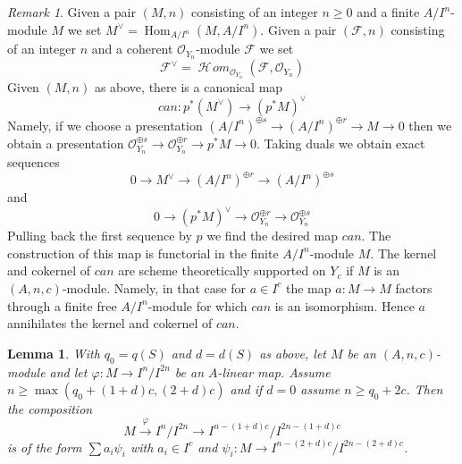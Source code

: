\documentclass{stacks-project}
\theoremstyle{plain}
\newtheorem{lemma}[subsection]{Lemma}
\theoremstyle{definition}
\theoremstyle{remark}
\newtheorem{remark}[subsection]{Remark}
\numberwithin{equation}{subsection}
\def\Hom{\mathop{\mathrm{Hom}}\nolimits}
\def\SheafHom{\mathop{\mathcal{H}\!\mathit{om}}\nolimits}
\begin{document}
\begin{remark}
\label{remark-duals}
Given a pair $(M, n)$ consisting of an integer $n \geq 0$
and a finite $A/I^n$-module $M$ we set $M^\vee = \Hom_{A/I^n}(M, A/I^n)$.
Given a pair $(\mathcal{F}, n)$ consisting of an integer $n$ and
a coherent $\mathcal{O}_{Y_n}$-module $\mathcal{F}$ we set
$$
\mathcal{F}^\vee =
\SheafHom_{\mathcal{O}_{Y_n}}(\mathcal{F}, \mathcal{O}_{Y_n})
$$
Given $(M, n)$ as above, there is a canonical map
$$
can : p^*(M^\vee) \longrightarrow (p^*M)^\vee
$$
Namely, if we choose a presentation
$(A/I^n)^{\oplus s} \to (A/I^n)^{\oplus r} \to M \to 0$
then we obtain a presentation
$\mathcal{O}_{Y_n}^{\oplus s} \to \mathcal{O}_{Y_n}^{\oplus r} \to
p^*M \to 0$. Taking duals we obtain exact sequences
$$
0 \to M^\vee \to (A/I^n)^{\oplus r} \to (A/I^n)^{\oplus s}
$$
and
$$
0 \to (p^*M)^\vee \to
\mathcal{O}_{Y_n}^{\oplus r} \to
\mathcal{O}_{Y_n}^{\oplus s}
$$
Pulling back the first sequence by $p$ we find the desired map $can$.
The construction of this map is functorial in the finite
$A/I^n$-module $M$. The kernel and cokernel of $can$
are scheme theoretically supported
on $Y_c$ if $M$ is an $(A, n, c)$-module. Namely, in that case for
$a \in I^c$ the map $a : M \to M$ factors through a finite free
$A/I^n$-module for which $can$ is an isomorphism. Hence $a$ annihilates
the kernel and cokernel of $can$.
\end{remark}

\begin{lemma}
\label{lemma-factor-hom}
With $q_0 = q(S)$ and $d = d(S)$ as above, let $M$ be an $(A, n, c)$-module
and let $\varphi : M \to I^n/I^{2n}$ be an $A$-linear map. Assume
$n \geq \max(q_0 + (1 + d)c, (2 + d)c)$ and if $d = 0$ assume
$n \geq q_0 + 2c$. Then the composition
$$
M \xrightarrow{\varphi} I^n/I^{2n} \to
I^{n - (1 + d)c}/I^{2n - (1 + d)c}
$$
is of the form $\sum a_i \psi_i$ with $a_i \in I^c$ and
$\psi_i : M \to I^{n - (2 + d)c}/I^{2n - (2 + d)c}$.
\end{lemma}
\end{document}
